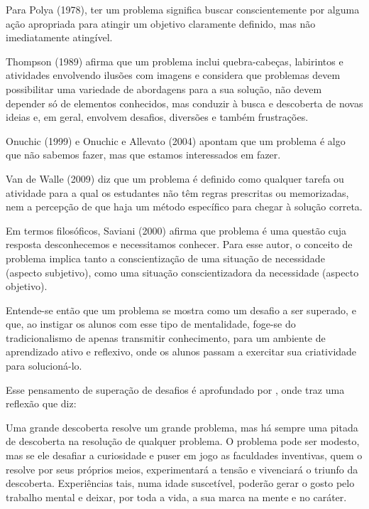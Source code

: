 \begin{citacao}
    Para Polya (1978), ter um problema significa buscar conscientemente por alguma ação apropriada para atingir um objetivo claramente definido, mas não imediatamente atingível.

    Thompson (1989) afirma que um problema inclui quebra-cabeças, labirintos e atividades envolvendo ilusões com imagens e considera que problemas devem possibilitar uma variedade de abordagens para a sua solução, não devem depender só de elementos conhecidos, mas conduzir à busca e descoberta de novas ideias e, em geral, envolvem desafios, diversões e também frustrações.

    Onuchic (1999) e Onuchic e Allevato (2004) apontam que um problema é algo que não sabemos fazer, mas que estamos interessados em fazer.

    Van de Walle (2009) diz que um problema é definido como qualquer tarefa ou atividade para a qual os estudantes não têm regras prescritas ou memorizadas, nem a percepção de que haja um método específico para chegar à solução correta.

    Em termos filosóficos, Saviani (2000) afirma que problema é uma questão cuja resposta desconhecemos e necessitamos conhecer. Para esse autor, o conceito de problema implica tanto a conscientização de uma situação de necessidade (aspecto subjetivo), como uma situação conscientizadora da necessidade (aspecto objetivo). \cite{Romanatto_2012}
\end{citacao}

Entende-se então que um problema se mostra como um desafio a ser superado, e que, ao instigar os alunos com esse tipo de mentalidade, foge-se do tradicionalismo de apenas transmitir conhecimento, para um ambiente de aprendizado ativo e reflexivo, onde os alunos passam a exercitar sua criatividade para solucioná-lo.

Esse pensamento de superação de desafios é aprofundado por , onde traz uma reflexão que diz:

\begin{citacao}
    Uma grande descoberta resolve um grande problema, mas há sempre uma pitada de descoberta na resolução de qualquer problema. O problema pode ser modesto, mas se ele desafiar a curiosidade e puser em jogo as faculdades inventivas, quem o resolve por seus próprios meios, experimentará a tensão e vivenciará o triunfo da descoberta. Experiências tais, numa idade suscetível, poderão gerar o gosto pelo trabalho mental e deixar, por toda a vida, a sua marca na mente e no caráter. \cite{polya1978}
\end{citacao}

